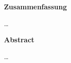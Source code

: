 \label{sec:abstract}
    \begin{center}
      \textbf{Zusammenfassung}
    \end{center}
    \dots
\vspace{4em}
    \begin{otherlanguage}{english}
        \begin{center}
          \textbf{Abstract}
        \end{center}
        \dots
    \end{otherlanguage}